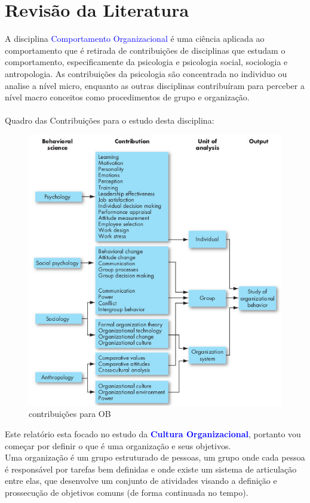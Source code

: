 {\section{Revisão da Literatura}
\qquad A disciplina \textcolor{blue}{Comportamento Organizacional} é uma ciência aplicada ao comportamento que é retirada de contribuições de disciplinas que estudam o comportamento, especificamente da psicologia e psicologia social, sociologia e antropologia.
As contribuições da psicologia são concentrada no individuo ou analise a nível micro, enquanto as outras disciplinas contribuíram para perceber a nível macro conceitos como procedimentos de grupo e organização.\\
\\
Quadro das Contribuições para o estudo desta disciplina:
\begin{figure}[H]
\centering
\includegraphics[scale=0.52]{./image/OB/OB_contributions.jpg}
\caption{contribuições para OB}
\end{figure}
Este relatório esta focado no estudo da \textcolor{blue}{\textbf{Cultura Organizacional}}, portanto vou começar por definir o que é uma organização e seus objetivos.\\

Uma organização é um grupo estruturado de pessoas, um grupo onde cada pessoa é responsável por tarefas bem definidas e onde existe um sistema de articulação entre elas, que desenvolve um conjunto de atividades visando a definição e prossecução de objetivos comuns (de forma continuada no tempo).\\

}
